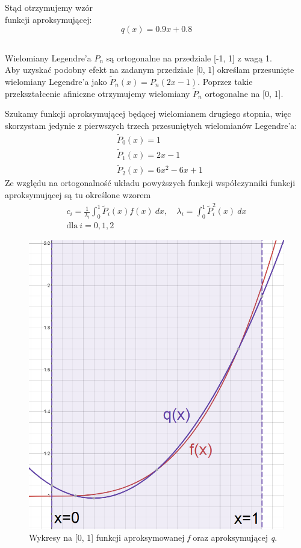 \documentclass{article}
\begin{document}
\noindent
Stąd otrzymujemy wzór\\
funkcji aproksymującej:
\[q(x) = 0.9x + 0.8\]

\clearpage

\subsection{}
Wielomiany Legendre'a \(P_n\) są ortogonalne na przedziale [-1, 1] z wagą 1.\\
Aby uzyskać podobny efekt na zadanym przedziale [0, 1] określam przesunięte wielomiany Legendre'a jako \(\widetilde{P}_n(x) = P_n(2x - 1)\). Poprzez takie przekształcenie afiniczne otrzymujemy wielomiany \(\widetilde{P}_n\) ortogonalne na [0, 1].

\noindent
Szukamy funkcji aproksymującej będącej wielomianem drugiego stopnia, więc skorzystam jedynie z pierwszych trzech przesuniętych wielomianów Legendre'a:
\begin{align*}
    &\widetilde{P}_0(x) = 1\\
    &\widetilde{P}_1(x) = 2x - 1\\
    &\widetilde{P}_2(x) = 6x^2 - 6x + 1
\end{align*}
Ze względu na ortogonalność układu powyższych funkcji współczynniki funkcji aproksymującej są tu określone wzorem
\begin{gather*}
    c_i = \frac{1}{\lambda_i} \int_0^1 \widetilde{P}_i(x) f(x)\ dx, \quad \lambda_i = \int_0^1 \widetilde{P}_i^2(x)\ dx\\
    \text{dla}\ i = 0, 1, 2
\end{gather*}
\begin{figure}
    \centering
    \includegraphics[width=\linewidth]{graph2.png}
    \caption{Wykresy na [0, 1] funkcji aproksymowanej \textit{f} oraz aproksymującej \textit{q}.}
\end{figure}
\end{document}
